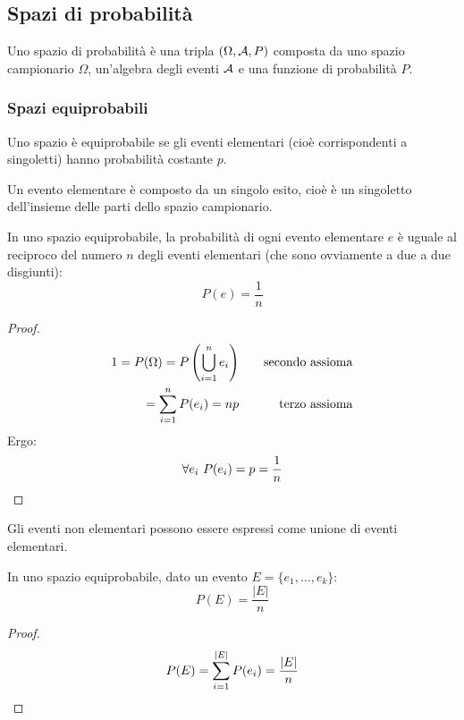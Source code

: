 \subsection{Spazi di probabilità}
\begin{defin}
	Uno spazio di probabilità è una tripla $(\Omega,\mathcal A,P)$ composta da uno spazio campionario $\Omega$, un'algebra degli eventi $\mathcal A$ e una funzione di probabilità $P$.
\end{defin}


\subsubsection{Spazi equiprobabili}
\begin{defin}
	Uno spazio è equiprobabile se gli eventi elementari (cioè corrispondenti a singoletti) hanno probabilità costante $p$.
\end{defin}

Un evento elementare è composto da un singolo esito, cioè è un singoletto dell'insieme delle parti dello spazio campionario.
\begin{teor}
	In uno spazio equiprobabile, la probabilità di ogni evento elementare $e$ è uguale al reciproco del numero $n$ degli eventi elementari (che sono ovviamente a due a due disgiunti):
	\begin{equation}
		P(e)=\frac{1}{n}
	\end{equation}
\end{teor}
\begin{proof}
	\begin{align*}
		1=P(\Omega)=P\left( \bigcup_{i=1}^n e_i \right) & \quad & \text{secondo assioma} \\
		=\sum_{i=1}^n P(e_i) = np & \quad & \text{terzo assioma}                         \\
	\end{align*}
	Ergo:
	\begin{equation*}
		\forall e_i ~ P(e_i)=p=\frac{1}{n} \qedhere
	\end{equation*}
\end{proof}

Gli eventi non elementari possono essere espressi come unione di eventi elementari.
\begin{teor}
	In uno spazio equiprobabile, dato un evento $E=\{e_1,\dots,e_k\}$:
	\begin{equation}
		P(E)=\frac{|E|}{n}
	\end{equation}
\end{teor}
\begin{proof}
	\begin{equation*}
		P(E)= \sum_{i=1}^{|E|} P(e_i) = \frac{|E|}{n} \qedhere
	\end{equation*}
\end{proof}
